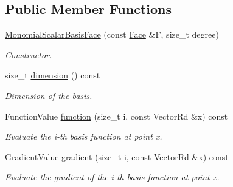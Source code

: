 \subsection*{Public Member Functions}
\begin{DoxyCompactItemize}
\item 
\hyperlink{classHArDCore3D_1_1MonomialScalarBasisFace_ad87f40b1e97ec1b95dcf9c56282912f3}{Monomial\+Scalar\+Basis\+Face} (const \hyperlink{classHArDCore3D_1_1Face}{Face} \&F, size\+\_\+t degree)
\begin{DoxyCompactList}\small\item\em Constructor. \end{DoxyCompactList}\item 
\mbox{\label{classHArDCore3D_1_1MonomialScalarBasisFace_a404551f2ca5ed4e605289addbc6fb9c4}} 
size\+\_\+t \hyperlink{classHArDCore3D_1_1MonomialScalarBasisFace_a404551f2ca5ed4e605289addbc6fb9c4}{dimension} () const
\begin{DoxyCompactList}\small\item\em Dimension of the basis. \end{DoxyCompactList}\item 
\mbox{\label{classHArDCore3D_1_1MonomialScalarBasisFace_a5dcaa7bcfc2afaf3615556f83bf1076b}} 
Function\+Value \hyperlink{classHArDCore3D_1_1MonomialScalarBasisFace_a5dcaa7bcfc2afaf3615556f83bf1076b}{function} (size\+\_\+t i, const Vector\+Rd \&x) const
\begin{DoxyCompactList}\small\item\em Evaluate the i-\/th basis function at point x. \end{DoxyCompactList}\item 
\mbox{\label{classHArDCore3D_1_1MonomialScalarBasisFace_a25989d831b6ca783612bc54ce0f25b66}} 
Gradient\+Value \hyperlink{classHArDCore3D_1_1MonomialScalarBasisFace_a25989d831b6ca783612bc54ce0f25b66}{gradient} (size\+\_\+t i, const Vector\+Rd \&x) const
\begin{DoxyCompactList}\small\item\em Evaluate the gradient of the i-\/th basis function at point x. \end{DoxyCompactList}\item 
\mbox{\label{classHArDCore3D_1_1MonomialScalarBasisFace_aadba906ff906d86d97cfcc1a5fbc505f}} 

\end{DoxyCompactItemize}
